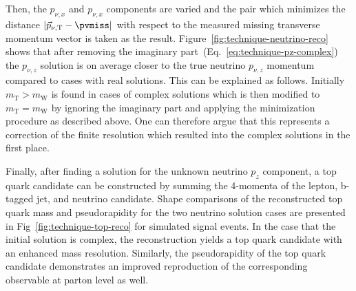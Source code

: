 Then, the $p_{\nu,x}$ and $p_{\nu,x}$ components are varied and the pair which minimizes the distance $|\vec{p}_{\nu,\mathrm{T}}-\pvmiss|$ with respect to the measured missing transverse momentum vector is taken as the result. Figure~\ref{fig:technique-neutrino-reco} shows that after removing the imaginary part~(Eq.~\ref{eq:technique-pz-complex}) the $p_{\nu,z}$ solution is on average closer to the true neutrino $p_{\nu,z}$ momentum compared to cases with real solutions. This can be explained as follows. Initially $m_\mathrm{T}>m_\mathrm{W}$ is found in cases of complex solutions which is then modified to $m_\mathrm{T}=m_\mathrm{W}$ by ignoring the imaginary part and applying the minimization procedure as described above. One can therefore argue that this represents a correction of the finite \met resolution which resulted into the complex solutions in the first place.

Finally, after finding a solution for the unknown neutrino $p_{z}$ component, a top quark candidate can be constructed by summing the 4-momenta of the lepton, b-tagged jet, and neutrino candidate. Shape comparisons of the reconstructed top quark mass and pseudorapidity for the two neutrino solution cases are presented in Fig~\ref{fig:technique-top-reco} for simulated signal events. In the case that the initial solution is complex, the reconstruction yields a top quark candidate with an enhanced mass resolution. Similarly, the pseudorapidity of the top quark candidate demonstrates an improved reproduction of the corresponding observable at parton level as well.



